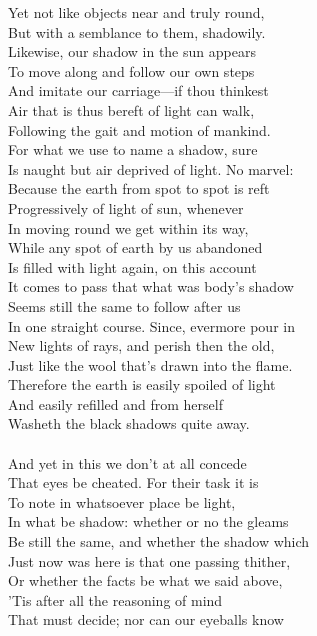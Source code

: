 Yet not like objects near and truly round,\\
But with a semblance to them, shadowily.\\
Likewise, our shadow in the sun appears\\
To move along and follow our own steps\\
And imitate our carriage—if thou thinkest\\
Air that is thus bereft of light can walk,\\
Following the gait and motion of mankind.\\
For what we use to name a shadow, sure\\
Is naught but air deprived of light. No marvel:\\
Because the earth from spot to spot is reft\\
Progressively of light of sun, whenever\\
In moving round we get within its way,\\
While any spot of earth by us abandoned\\
Is filled with light again, on this account\\
It comes to pass that what was body's shadow\\
Seems still the same to follow after us\\
In one straight course. Since, evermore pour in\\
New lights of rays, and perish then the old,\\
Just like the wool that's drawn into the flame.\\
Therefore the earth is easily spoiled of light\\
And easily refilled and from herself\\
Washeth the black shadows quite away.\\
\\
And yet in this we don't at all concede\\
That eyes be cheated. For their task it is\\
To note in whatsoever place be light,\\
In what be shadow: whether or no the gleams\\
Be still the same, and whether the shadow which\\
Just now was here is that one passing thither,\\
Or whether the facts be what we said above,\\
'Tis after all the reasoning of mind\\
That must decide; nor can our eyeballs know\\
